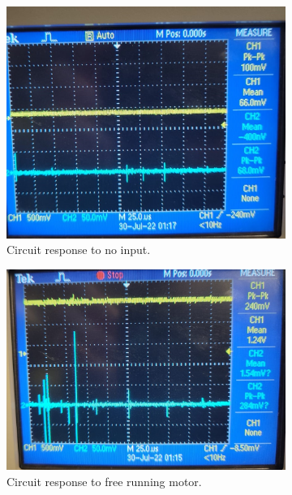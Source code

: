 \begin{figure}[H]
\centering
\begin{subfigure}[]{0.3\textwidth}
\includegraphics[width=\linewidth]{./Figures/CurSens_Prac_0input.jpeg}
\caption{Circuit response to no input.}
\label{subfig:cursen_prac_noin}	
\end{subfigure}
\hfill
\begin{subfigure}[]{0.3\textwidth}
\includegraphics[width=\linewidth]{./Figures/CurSens_Prac_Free.jpeg}
\caption{Circuit response to free running motor.} 			
\label{subfig:cursen_prac_free}	
\end{subfigure}
\hfill
\begin{subfigure}[]{0.3\textwidth}

\end{subfigure}
\end{figure}
